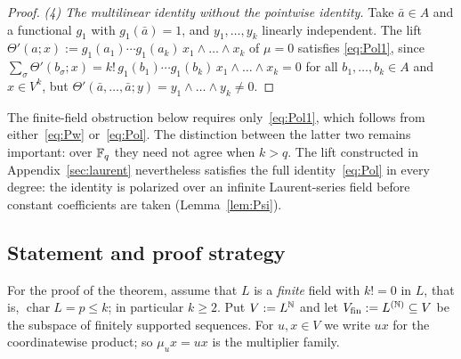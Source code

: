 \begin{proof}
\emph{(4) The multilinear identity without the pointwise identity.} Take $\bar a\in A$ and a functional $g_1$ with $g_1(\bar a)=1$, and $y_1,\dots,y_k$ linearly independent. The
lift $\Theta'(a;x):=g_1(a_1)\cdots g_1(a_k)\,x_1\wedge\dots\wedge x_k$ of $\mu=0$ satisfies \eqref{eq:Pol1}, since
$\sum_\sigma\Theta'(b_\sigma;x)=k!\,g_1(b_1)\cdots g_1(b_k)\,x_1\wedge\dots\wedge x_k=0$ for all
$b_1,\dots,b_k\in A$ and $x\in V^k$, but $\Theta'(\bar a,\dots,\bar a;y)=y_1\wedge\dots\wedge y_k\neq0$.
\end{proof}

The finite-field obstruction below requires only~\eqref{eq:Pol1}, which follows from either~\eqref{eq:Pw}
or~\eqref{eq:Pol}. The distinction between the latter two remains important: over $\mathbb F_q$ they need not agree when
$k>q$. The lift constructed in Appendix~\ref{sec:laurent} nevertheless satisfies the full identity~\eqref{eq:Pol} in every
degree: the identity is polarized over an infinite Laurent-series field before constant coefficients are taken
(Lemma~\ref{lem:Psi}).

\subsection{Statement and proof strategy}
For the proof of the theorem, assume that $L$ is a \emph{finite} field with $k!=0$ in $L$, that is, $\operatorname{char}L=p\le k$; in
particular $k\ge2$. Put $V:=L^\mathbb N$ and let $V_{\mathrm{fin}}:=L^{(\mathbb N)}\subseteq V$ be the subspace of finitely supported
sequences. For $u,x\in V$ we write $ux$ for the coordinatewise product; so $\mu_ux=ux$ is the multiplier family.

